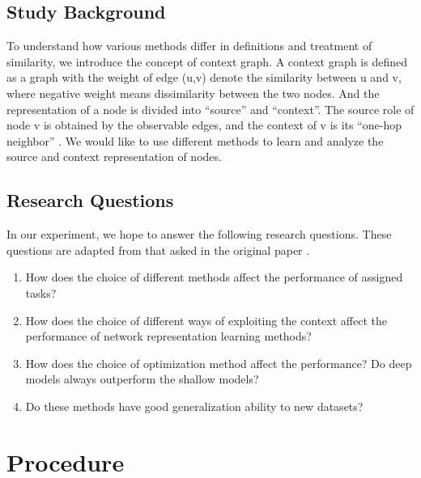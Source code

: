 \documentclass[a4paper]{article}
\begin{document}
\subsection{Study Background}


\noindent To understand how various methods differ in definitions and treatment of similarity, we introduce the concept of context graph. A context graph is defined as a graph with the weight of edge (u,v) denote the similarity between u and v, where negative weight means dissimilarity between the two nodes. And the representation of a node is divided into “source” and “context”. The source role of node v is obtained by the observable edges, and the context of v is its “one-hop neighbor” \cite{a}. We would like to use different methods to learn and analyze the source and context representation of nodes.


\subsection{Research Questions} 


\noindent In our experiment, we hope to answer the following research questions. These questions are adapted from that asked in the original paper \cite{a}.

\begin{enumerate}[1.]

\item How does the choice of different methods affect the performance of assigned tasks?

\item How does the choice of different ways of exploiting the context affect the performance of network representation learning methods? 

\item How does the choice of optimization method affect the performance? Do deep models always outperform the shallow models? 

\item Do these methods have good generalization ability to new datasets?

\end{enumerate}

\section{Procedure}
\end{document}
